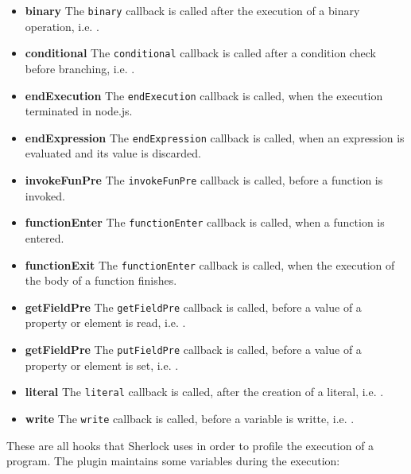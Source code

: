 \begin{itemize}
\item{\textbf{binary}} The \texttt{binary} callback is called after the execution of a binary operation, i.e. \js{<, +, ==, !=, >=}.

\item{\textbf{conditional}} The \texttt{conditional} callback is called after a condition check before branching, i.e. .

\item{\textbf{endExecution}} The \texttt{endExecution} callback is called, when the execution terminated in node.js.

\item{\textbf{endExpression}} The \texttt{endExpression} callback is called, when an expression is evaluated and its value is discarded.

\item{\textbf{invokeFunPre}} The \texttt{invokeFunPre} callback is called, before a function is invoked.

\item{\textbf{functionEnter}} The \texttt{functionEnter} callback is called, when a function is entered.

\item{\textbf{functionExit}} The \texttt{functionEnter} callback is called, when the execution of the body of a function finishes.

\item{\textbf{getFieldPre}} The \texttt{getFieldPre} callback is called, before a value of a property or element is read, i.e. .

\item{\textbf{getFieldPre}} The \texttt{putFieldPre} callback is called, before a value of a property or element is set, i.e. .

\item{\textbf{literal}} The \texttt{literal} callback is called, after the creation of a literal, i.e. .

\item{\textbf{write}} The \texttt{write} callback is called, before a variable is writte, i.e. .

\end{itemize}

These are all hooks that Sherlock uses in order to profile the execution of a program. The plugin maintains some variables during the execution:

